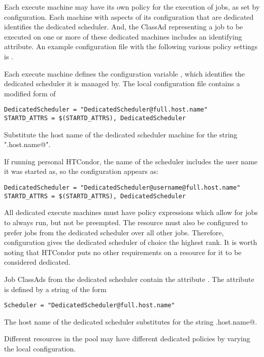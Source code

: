 Each execute machine may have its own policy for the execution of jobs,
as set by configuration.
Each machine with aspects of its configuration that are dedicated
identifies the dedicated scheduler.
And, the ClassAd representing a job to be executed on
one or more of these dedicated machines includes an identifying attribute.
An example configuration file with the following various policy settings
is .

Each execute machine defines the configuration variable
, which identifies
the dedicated scheduler it is managed by.
The local configuration file contains a modified form of

\begin{verbatim}
DedicatedScheduler = "DedicatedScheduler@full.host.name"
STARTD_ATTRS = $(STARTD_ATTRS), DedicatedScheduler
\end{verbatim}

Substitute the host name of the dedicated scheduler
machine for the string "\verb@full.host.name@". 

If running personal HTCondor, the name of the scheduler includes
the user name it was started as, so the configuration appears as:

\begin{verbatim}
DedicatedScheduler = "DedicatedScheduler@username@full.host.name"
STARTD_ATTRS = $(STARTD_ATTRS), DedicatedScheduler
\end{verbatim}

All dedicated execute machines must have policy expressions which allow for
jobs to always run, but not be preempted.
The resource must also be configured to prefer jobs from the dedicated 
scheduler over all other jobs.
Therefore, configuration gives
the dedicated scheduler of choice the highest rank.
It is worth noting that HTCondor puts no other requirements on a
resource for it to be considered dedicated.  

Job ClassAds from the dedicated scheduler 
contain the attribute .
The attribute is defined by a string of the form 
\begin{verbatim}
Scheduler = "DedicatedScheduler@full.host.name"
\end{verbatim}
The host name of the dedicated scheduler
substitutes for the string \verb@full.host.name@. 

Different resources in the pool may have different dedicated policies
by varying the local configuration.

